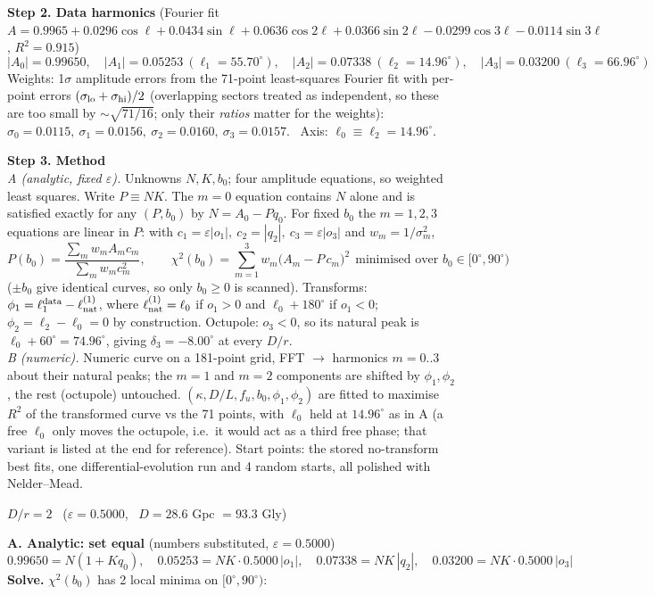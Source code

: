 \documentclass[10pt]{article}
\begin{document}
\medskip\textbf{Step 2. Data harmonics} (Fourier fit $A=0.9965+0.0296\cos\ell+0.0434\sin\ell+0.0636\cos2\ell+0.0366\sin2\ell-0.0299\cos3\ell-0.0114\sin3\ell$, $R^2=0.915$)
\[
|A_0|=0.99650,\quad |A_1|=0.05253\ (\ell_1=55.70^\circ),\quad |A_2|=0.07338\ (\ell_2=14.96^\circ),\quad |A_3|=0.03200\ (\ell_3=66.96^\circ)
\]
Weights: 1$\sigma$ amplitude errors from the 71-point least-squares Fourier fit with per-point errors $(\sigma_{\rm lo}+\sigma_{\rm hi})/2$ (overlapping sectors treated as independent, so these are too small by $\sim\sqrt{71/16}$; only their \emph{ratios} matter for the weights):
$\sigma_0=0.0115,\ \sigma_1=0.0156,\ \sigma_2=0.0160,\ \sigma_3=0.0157$. \ Axis: $\ell_0\equiv\ell_2=14.96^\circ$.

\medskip\textbf{Step 3. Method}\\
\emph{A (analytic, fixed $\varepsilon$).} Unknowns $N,K,b_0$; four amplitude equations, so weighted least squares. Write $P\equiv NK$. The $m{=}0$ equation contains $N$ alone and is satisfied exactly for any $(P,b_0)$ by $N=A_0-Pq_0$.
For fixed $b_0$ the $m{=}1,2,3$ equations are linear in $P$: with $c_1=\varepsilon|o_1|,\ c_2=|q_2|,\ c_3=\varepsilon|o_3|$ and $w_m=1/\sigma_m^2$,
\[
P(b_0)=\frac{\sum_m w_mA_mc_m}{\sum_m w_mc_m^2},\qquad \chi^2(b_0)=\sum_{m=1}^3w_m\big(A_m-P\,c_m\big)^2\ \ \text{minimised over }b_0\in[0^\circ,90^\circ)
\]
($\pm b_0$ give identical curves, so only $b_0\ge0$ is scanned).
Transforms: $\phi_1=\ell_1^{\rm data}-\ell^{(1)}_{\rm nat}$, where $\ell^{(1)}_{\rm nat}=\ell_0$ if $o_1>0$ and $\ell_0+180^\circ$ if $o_1<0$; $\phi_2=\ell_2-\ell_0=0$ by construction. Octupole: $o_3<0$, so its natural peak is $\ell_0+60^\circ=74.96^\circ$, giving $\delta_3=-8.00^\circ$ at every $D/r$.\\
\emph{B (numeric).} Numeric curve on a 181-point grid, FFT $\to$ harmonics $m=0..3$ about their natural peaks; the $m{=}1$ and $m{=}2$ components are shifted by $\phi_1,\phi_2$, the rest (octupole) untouched.
$(\kappa,D/L,f_u,b_0,\phi_1,\phi_2)$ are fitted to maximise $R^2$ of the transformed curve vs the 71 points, with $\ell_0$ held at $14.96^\circ$ as in A (a free $\ell_0$ only moves the octupole, i.e.\ it would act as a third free phase; that variant is listed at the end for reference).
Start points: the stored no-transform best fits, one differential-evolution run and 4 random starts, all polished with Nelder--Mead.

\clearpage
{\large\bfseries\boldmath $D/r=2$} \ ($\varepsilon=0.5000$, \ $D=28.6$ Gpc $=93.3$ Gly)

\textbf{A. Analytic: set equal} (numbers substituted, $\varepsilon=0.5000$)
\[ 0.99650=N(1+Kq_0),\quad 0.05253=NK\cdot0.5000\,|o_1|,\quad 0.07338=NK\,|q_2|,\quad 0.03200=NK\cdot0.5000\,|o_3| \]
\textbf{Solve.} $\chi^2(b_0)$ has 2 local minima on $[0^\circ,90^\circ)$:
\end{document}
